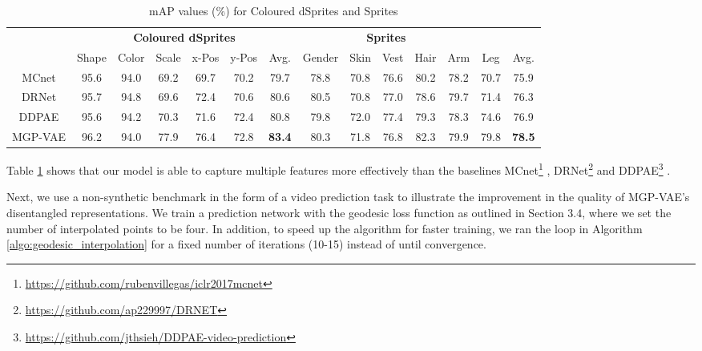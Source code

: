 \documentclass[runningheads]{llncs}
\begin{document}
	\begin{table}[H]
	\scriptsize
      \centering
        \caption{mAP values (\%) for Coloured dSprites and Sprites}        
        \begin{tabular}{c|cccccc|ccccccc} \hline       
          \label{mAP}
          \multirow{2}{*}{\textbf{Model}} & \multicolumn{6}{c}{\textbf{Coloured dSprites}} & \multicolumn{5}{c}{\textbf{Sprites}} \\ 
          & Shape & Color & Scale & x-Pos & y-Pos & Avg. & Gender & Skin & Vest & Hair & Arm & Leg & Avg. \\ \hline
          MCnet & 95.6 & 94.0 & 69.2 & 69.7 & 70.2 & 79.7 & 78.8 & 70.8 & 76.6 & 80.2 & 78.2 & 70.7 & 75.9 \\ 
          DRNet & 95.7 & 94.8 & 69.6 & 72.4 & 70.6 & 80.6 & 80.5 & 70.8 & 77.0 & 78.6 & 79.7 & 71.4 & 76.3 \\ 
          DDPAE & 95.6 & 94.2 & 70.3 & 71.6 & 72.4 & 80.8 & 79.8 & 72.0 & 77.4 & 79.3 & 78.3 & 74.6 & 76.9 \\ 
          MGP-VAE & 96.2 & 94.0 & 77.9 & 76.4 & 72.8 & \textbf{83.4} & 80.3 & 71.8 & 76.8 & 82.3 & 79.9 & 79.8 & \textbf{78.5} \\ \hline
          \end{tabular}
	\end{table}

	Table \ref{mAP} shows that our model is able to capture multiple features more effectively than the baselines MCnet\footnote{\href{https://github.com/rubenvillegas/iclr2017mcnet}{https://github.com/rubenvillegas/iclr2017mcnet}} \cite{Villegas2017DecomposingMA}, DRNet\footnote{\href{https://github.com/ap229997/DRNET}{https://github.com/ap229997/DRNET}} \cite{Denton2017UnsupervisedLO} and DDPAE\footnote{\href{https://github.com/jthsieh/DDPAE-video-prediction}{https://github.com/jthsieh/DDPAE-video-prediction}} \cite{Hsieh2018LearningTD}. \par 

	Next, we use a non-synthetic benchmark in the form of a video prediction task to illustrate the improvement in the quality of MGP-VAE's disentangled representations. We train a prediction network with the geodesic loss function as outlined in Section 3.4, where we set the number of interpolated points to be four. In addition, to speed up the algorithm for faster training, we ran the loop in Algorithm \ref{algo:geodesic_interpolation} for a fixed number of iterations (10-15) instead of until convergence. \par
   
\end{document}
